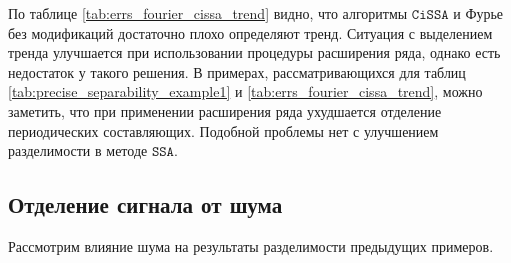 \documentclass[12pt, specialist, subf
]{disser}
\theoremstyle{definition}
\newcommand{\SSA}{\texttt{SSA}}
\newcommand{\CISSA}{\texttt{CiSSA}}
\begin{document}
По таблице \ref{tab:errs_fourier_cissa_trend} видно, что алгоритмы $\CISSA$ и Фурье без модификаций достаточно плохо определяют тренд. Ситуация с выделением тренда улучшается при использовании процедуры расширения ряда, однако есть недостаток у такого решения. В примерах, рассматривающихся  для таблиц \ref{tab:precise_separability_example1} и \ref{tab:errs_fourier_cissa_trend}, можно заметить, что при применении расширения ряда ухудшается отделение периодических составляющих. Подобной проблемы нет с улучшением разделимости в методе $\SSA$.

\subsection{Отделение сигнала от шума}


Рассмотрим влияние шума на результаты разделимости предыдущих примеров.
\end{document}
